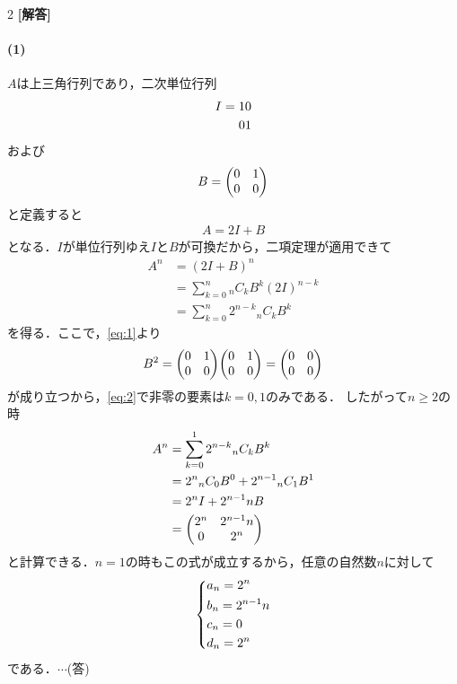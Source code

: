 \documentclass[../../main.tex]{subfiles}
\begin{document}
\setcounter{equation}{0}
\setcounter{figure}{0}
\setcounter{table}{0}
\begin{oframed}
  
\end{oframed}
\setlength{\columnseprule}{0.4pt}
\begin{multicols}{2}
  {\bf [解答]}

  \paragraph{(1)}
  $A$は上三角行列であり，二次単位行列
  \begin{align}
    I = \imat{2}
  \end{align}
  および
  \begin{align}
    B = \mqty(0 & 1 \\ 0 & 0 ) \label{eq:1}
  \end{align}
  と定義すると
  \begin{align}
    A = 2I + B
  \end{align}
  となる．$I$が単位行列ゆえ$I$と$B$が可換だから，二項定理が適用できて
  \begin{align}
    A^n
    & = \left(2I+B\right)^{n}                                       \\
    & = \sum_{k=0}^{n} {}_{n}C_{k} B^{k}(2I)^{n-k}                  \\
    & = \sum_{k=0}^{n} 2^{n-k}{}_{n}C_{k} B^{k} \label{eq:2}
  \end{align}
  を得る．ここで，\cref{eq:1}より
  \begin{align}
    B^{2} = \mqty(0 & 1 \\ 0 & 0 )\mqty(0 & 1 \\ 0 & 0 ) = \mqty(\zmat{2}{2})
  \end{align}
  が成り立つから，\cref{eq:2}で非零の要素は$k=0,1$のみである．
  したがって$n \ge 2$の時
  \begin{align}
    A^{n}
    & = \sum_{k=0}^{1} 2^{n-k}{}_{n}C_{k} B^{k}                      \\
    & = 2^{n}{}_{n}C_{0} B^{0} + 2^{n-1}{}_{n}C_{1} B^{1}            \\
    & = 2^{n} I + 2^{n-1}n B                                         \\
    & = \mqty(2^{n}                                       & 2^{n-1}n \\
    0 & 2^{n})
  \end{align}
  と計算できる．$n=1$の時もこの式が成立するから，任意の自然数$n$に対して
  \begin{align}
    \begin{dcases}
      a_n = 2^{n}       \\
      b_n =    2^{n-1}n \\
      c_n = 0           \\
      d_n = 2^{n}
    \end{dcases}
  \end{align}
  である．$\cdots$(答)


\end{multicols}
\end{document}
